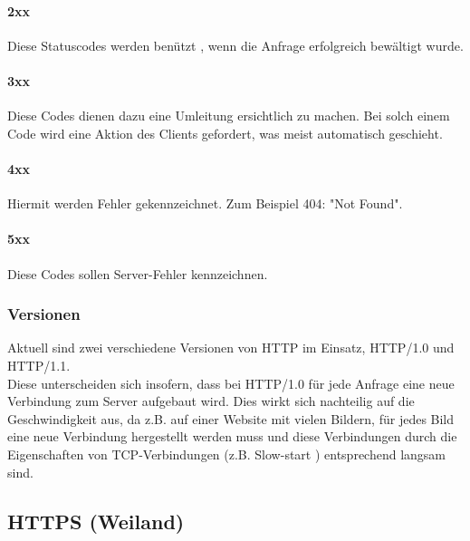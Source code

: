 \paragraph{2xx}
Diese Statuscodes werden benützt , wenn die Anfrage erfolgreich bewältigt wurde.  
\paragraph{3xx}
Diese Codes dienen dazu eine Umleitung ersichtlich zu machen. Bei solch einem Code wird eine Aktion des Clients gefordert, was meist automatisch geschieht.
\paragraph{4xx}
Hiermit werden Fehler gekennzeichnet. Zum Beispiel 404: "Not Found".
\paragraph{5xx}
Diese Codes sollen Server-Fehler kennzeichnen.

\subsubsection{Versionen}
Aktuell sind zwei verschiedene Versionen von HTTP im Einsatz, HTTP/1.0 und HTTP/1.1.
\\
Diese unterscheiden sich insofern, dass bei HTTP/1.0 für jede Anfrage eine neue Verbindung zum Server aufgebaut wird. Dies wirkt sich nachteilig auf die Geschwindigkeit aus, da z.B. auf einer Website mit vielen Bildern, für jedes Bild eine neue Verbindung hergestellt werden muss und diese Verbindungen durch die Eigenschaften von TCP-Verbindungen (z.B. Slow-start ) entsprechend langsam sind.

\subsection{HTTPS (Weiland)}
